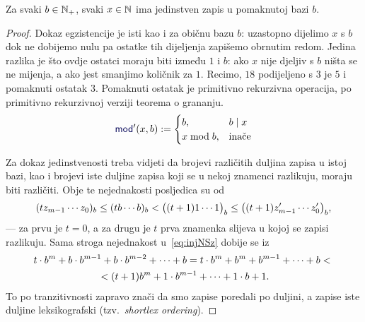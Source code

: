 \begin{lema}[{name=[egzistencija i jedinstvenost zapisa u pomaknutoj bazi]}]\label{lm:pomakbaza}
Za svaki $b\in{\mathbb N}_+$, svaki $x\in{\mathbb N}$ ima jedinstven zapis u pomaknutoj bazi $b$.
\end{lema}
\begin{proof}
Dokaz egzistencije je isti kao i za običnu bazu $b$: uzastopno dijelimo $x$ s $b$ dok ne dobijemo nulu pa ostatke tih dijeljenja zapišemo obrnutim redom. Jedina razlika je što ovdje ostatci moraju biti između $1$ i $b$: ako $x$ nije djeljiv s $b$ ništa se ne mijenja, a ako jest smanjimo količnik za $1$. Recimo, $18$ podijeljeno s $3$ je $5$ i pomaknuti ostatak $3$. Pomaknuti ostatak je primitivno rekurzivna operacija, po primitivno rekurzivnoj verziji teorema o grananju.
	\vspace{-1em}
\begin{equation}
    \f{mod}'(x,b):=\begin{cases}
        b,&b\mid x\\
        x\bmod b,&\text{inače}
    \end{cases}
\end{equation}

Za dokaz jedinstvenosti treba vidjeti da brojevi različitih duljina zapisa u istoj bazi, kao i brojevi iste duljine zapisa koji se u nekoj znamenci razlikuju, moraju biti različiti. Obje te nejednakosti posljedica su od
\begin{equation}
\label{eq:injNSz}
    (tz_{m-1}\dotsm z_0)_b\le
    (tb\dotsm b)_b<
    \bigl((t+1)1\dotsm1\bigr)_b\le
    \bigl((t+1)z_{m-1}'\dotsm z_0'\bigr)_b\text,
\end{equation}
--- za prvu je $t=0$, a za drugu je $t$ prva znamenka slijeva u kojoj se zapisi razlikuju. Sama stroga nejednakost u~\eqref{eq:injNSz} dobije se iz
\begin{multline}
    t\cdot b^m+b\cdot b^{m-1}+b\cdot b^{m-2}+\dotsb+b=
    t\cdot b^m+b^m+b^{m-1}+\dotsb+b<{}\\
    {}<(t+1)b^m+1\cdot b^{m-1}+\dotsb+1\cdot b+1\text.
\end{multline}
To po tranzitivnosti zapravo znači da smo zapise poredali po duljini, a zapise iste duljine leksikografski (tzv.\ \emph{shortlex ordering}).
\end{proof}


